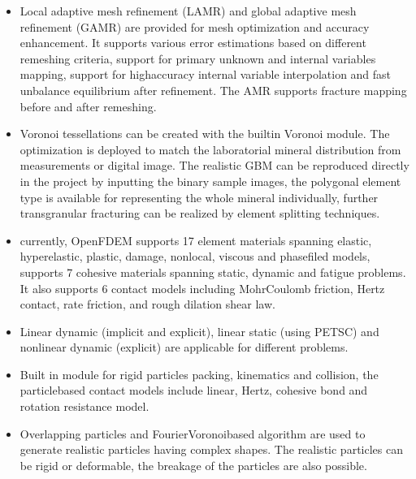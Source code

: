 \documentclass[letterpaper,10pt,english]{sphinxmanual}
\begin{document}
\begin{itemize}
\item {} 
 \textendash{} Local adaptive mesh refinement (LAMR) and global adaptive mesh refinement (GAMR) are provided for mesh optimization and accuracy enhancement. It supports various error estimations based on different remeshing criteria, support for primary unknown and internal variables mapping, support for high\sphinxhyphen{}accuracy internal variable interpolation and fast unbalance equilibrium after refinement. The AMR supports fracture mapping before and after remeshing.

\item {} 
 \textendash{} Voronoi tessellations can be created with the built\sphinxhyphen{}in Voronoi module. The optimization is deployed to match the laboratorial mineral distribution from measurements or digital image. The realistic GBM can be reproduced directly in the project by inputting the binary sample images, the polygonal element type is available for representing the whole mineral individually, further transgranular fracturing can be realized by element splitting techniques.

\item {} 
 \textendash{} currently, OpenFDEM supports 17 element materials spanning elastic, hyperelastic, plastic, damage, nonlocal, viscous and phasefiled models, supports 7 cohesive materials spanning static, dynamic and fatigue problems. It also supports 6 contact models including Mohr\sphinxhyphen{}Coulomb friction, Hertz contact, rate friction, and rough dilation shear law.

\item {} 
 \sphinxhyphen{} Linear dynamic (implicit and explicit), linear static (using PETSC) and nonlinear dynamic (explicit) are applicable for different problems.

\end{itemize}

\begin{itemize}
\item {} 
 \sphinxhyphen{} Built in module for rigid particles packing, kinematics and collision, the particle\sphinxhyphen{}based contact models include linear, Hertz, cohesive bond and rotation resistance model.

\item {} 
 \sphinxhyphen{} Overlapping particles and Fourier\sphinxhyphen{}Voronoi\sphinxhyphen{}based algorithm are used to generate realistic particles having complex shapes. The realistic particles can be rigid or deformable, the breakage of the particles are also possible.

\end{itemize}
\end{document}
